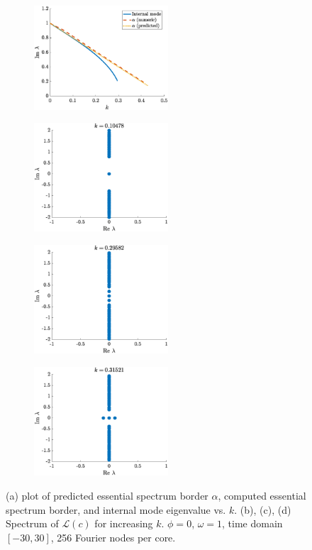 \documentclass[11pt,reqno]{amsart}
\def\calL{{\mathcal L}}
\begin{document}
\begin{figure}
    \centering
    \begin{subfigure}{0.4\linewidth}
        \caption{}
        \label{fig:phi0speca}
        \includegraphics[width=5cm]{phi0speck.eps}
    \end{subfigure}
    \begin{subfigure}{0.4\linewidth}
        \caption{}
        \label{fig:phi0specb}
        \includegraphics[width=5cm]{phi0spec1.eps}
    \end{subfigure}
        \begin{subfigure}{0.4\linewidth}
        \caption{}
        \label{fig:phi0specc}
        \includegraphics[width=5cm]{phi0spec2.eps}
    \end{subfigure}
    \begin{subfigure}{0.4\linewidth}
        \caption{}
        \label{fig:phi0specd}
        \includegraphics[width=5cm]{phi0spec3.eps}
    \end{subfigure}
    \caption{(a) plot of predicted essential spectrum border $\alpha$, computed essential spectrum border, and internal mode eigenvalue vs. $k$. (b), (c), (d) Spectrum of $\calL(c)$ for increasing $k$. $\phi =0$, $\omega=1$, time domain $[-30,30]$, 256 Fourier nodes per core.}
    \label{fig:phi0spec}
\end{figure}
\end{document}

